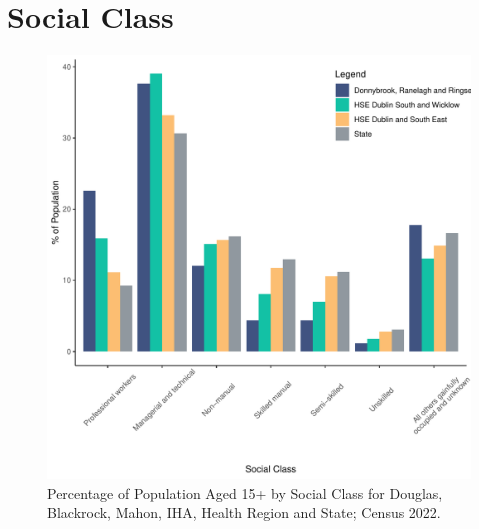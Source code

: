 \documentclass{article}
\begin{document}
\section{Social Class}\label{sect:SC}
\begin{figure}[H]
	\centering
	\includegraphics[width = 140mm]{../figures/SocialClassED.pdf}
	\caption{Percentage of Population Aged 15+ by Social Class for Douglas, Blackrock, Mahon, IHA, Health Region and State; Census 2022.}
	\label{fig:vbnv}
	\end{figure}
\end{document}
